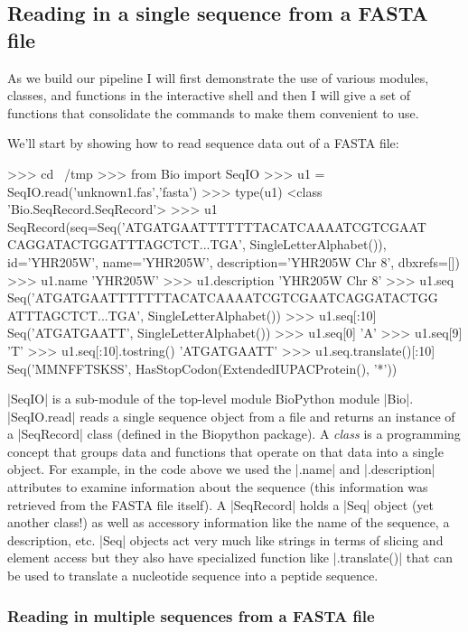 \subsection*{Reading in a single sequence from a FASTA file}

As we build our pipeline I will first demonstrate the use of various modules, classes, and functions in the interactive shell and then I will give a set of functions that consolidate the commands to make them convenient to use.  

We'll start by showing how to read sequence data out of a FASTA file:
\begin{python}
>>> cd ~/tmp
>>> from Bio import SeqIO
>>> u1 = SeqIO.read('unknown1.fas','fasta')
>>> type(u1)
<class 'Bio.SeqRecord.SeqRecord'>
>>> u1
SeqRecord(seq=Seq('ATGATGAATTTTTTTACATCAAAATCGTCGAAT
CAGGATACTGGATTTAGCTCT...TGA', SingleLetterAlphabet()), 
id='YHR205W', name='YHR205W', description='YHR205W  Chr 8', dbxrefs=[])
>>> u1.name
'YHR205W'
>>> u1.description
'YHR205W  Chr 8'
>>> u1.seq
Seq('ATGATGAATTTTTTTACATCAAAATCGTCGAATCAGGATACTGG
ATTTAGCTCT...TGA', SingleLetterAlphabet())
>>> u1.seq[:10]
Seq('ATGATGAATT', SingleLetterAlphabet())
>>> u1.seq[0]
'A'
>>> u1.seq[9]
'T'
>>> u1.seq[:10].tostring()
'ATGATGAATT'
>>> u1.seq.translate()[:10]
Seq('MMNFFTSKSS', HasStopCodon(ExtendedIUPACProtein(), '*'))
\end{python}

|SeqIO| is a sub-module of the top-level module BioPython module |Bio|.  |SeqIO.read| reads a single sequence object from a file and returns an instance of a |SeqRecord| class (defined in the Biopython package). A \emph{class} is a programming concept that groups data and functions that operate on that data into a single object. For example, in the code above we used the |.name| and |.description| attributes to examine information about the sequence (this information was retrieved from the FASTA file itself).  A |SeqRecord| holds a |Seq| object (yet another class!) as well as accessory information like the name of the sequence, a description, etc. |Seq| objects act very much like strings in terms of slicing and element access but they also have specialized function like |.translate()| that can be used to translate a nucleotide sequence into a peptide sequence. 

\subsubsection*{Reading in multiple sequences from a FASTA file}

